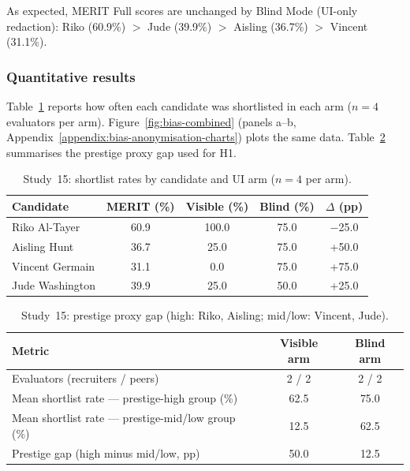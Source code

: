 As expected, MERIT Full scores are unchanged by Blind Mode (UI-only redaction): Riko (60.9\%) $>$ Jude (39.9\%) $>$ Aisling (36.7\%) $>$ Vincent (31.1\%).

\subsubsection{Quantitative results}
Table~\ref{tab:bias-audit-summary} reports how often each candidate was shortlisted in each arm ($n = 4$ evaluators per arm). 
Figure~\ref{fig:bias-combined} 
(panels a--b, Appendix~\ref{appendix:bias-anonymisation-charts}) 
plots the same data. Table~\ref{tab:bias-disparity-metrics} 
summarises the prestige proxy gap used for H1.

\begin{table}[htbp]
    \centering
    \caption[Study~15: Blind Mode shortlist rates]{Study~15: shortlist rates by candidate and UI arm ($n = 4$ per arm).}
    \label{tab:bias-audit-summary}
    \vspace{1.5ex}
    \small
    \begin{tabular}{l c c c c}
        \toprule
        \textbf{Candidate} & \textbf{MERIT (\%)} & \textbf{Visible (\%)} & \textbf{Blind (\%)} & \textbf{$\Delta$ (pp)} \\ \midrule
        Riko Al-Tayer      & 60.9 & 100.0 & 75.0 & $-$25.0 \\
        Aisling Hunt       & 36.7 & 25.0  & 75.0 & +50.0 \\
        Vincent Germain    & 31.1 & 0.0   & 75.0 & +75.0 \\
        Jude Washington    & 39.9 & 25.0  & 50.0 & +25.0 \\ \bottomrule
    \end{tabular}
\end{table}

\begin{table}[htbp]
    \centering
    \caption[Study~15: Aggregate disparity metrics]{Study~15: prestige proxy gap (high: Riko, Aisling; mid/low: Vincent, Jude).}
    \label{tab:bias-disparity-metrics}
    \vspace{1.5ex}
    \small
    \begin{tabular}{l c c}
        \toprule
        \textbf{Metric} & \textbf{Visible arm} & \textbf{Blind arm} \\ \midrule
        Evaluators (recruiters / peers) & 2 / 2 & 2 / 2 \\
        Mean shortlist rate --- prestige-high group (\%) & 62.5 & 75.0 \\
        Mean shortlist rate --- prestige-mid/low group (\%) & 12.5 & 62.5 \\
        Prestige gap (high minus mid/low, pp) & 50.0 & 12.5 \\ \bottomrule
    \end{tabular}
\end{table}

